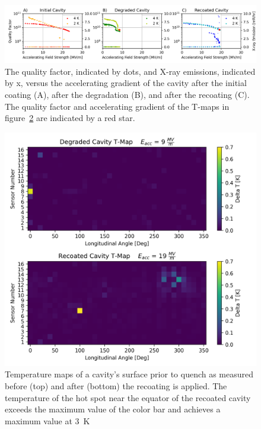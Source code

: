 \begin{figure}[h]%
    \centering%
    \includegraphics[width=1.0\columnwidth]{./figures/VTS.png}%
    \caption{The quality factor, indicated by dots, and X-ray emissions, indicated by x, versus the accelerating gradient of the cavity after the initial coating (A), after the degradation (B), and after the recoating (C). The quality factor and accelerating gradient of the T-maps in figure~{\protect\ref{fig:TMAP}} are indicated by a red star.}%
    \label{fig:VTS}%
\end{figure}

\begin{figure}[h]%
    \centering%
    \includegraphics{./figures/TMAP.png}%
    \caption{Temperature maps of a cavity's surface prior to quench as measured before (top) and after (bottom) the recoating is applied. The temperature of the hot spot near the equator of the recoated cavity exceeds the maximum value of the color bar and achieves a maximum value at \qty{3}{\kelvin}}%
    \label{fig:TMAP}%
\end{figure}

